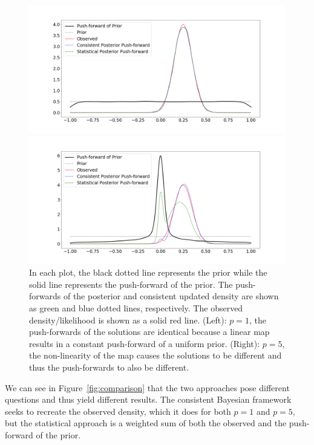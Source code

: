 \begin{ex}
\begin{figure}
\begin{minipage}{.45\textwidth}
		\includegraphics[width=\linewidth]{./images/comparison1}
\end{minipage}
\begin{minipage}{.45\textwidth}
		\includegraphics[width=\linewidth]{./images/comparison5}
\end{minipage}
\caption{In each plot, the black dotted line represents the prior while the solid line represents the push-forward of the prior. The push-forwards of the posterior and consistent updated density are shown as green and blue dotted lines, respectively. The observed density/likelihood is shown as a solid red line. (Left): $p = 1$, the push-forwards of the solutions are identical because a linear map results in a constant push-forward of a uniform prior. (Right): $p = 5$, the non-linearity of the map causes the solutions to be different and thus the push-forwards to also be different.}
\end{figure}

We can see in Figure~\ref{fig:comparison} that the two approaches pose different questions and thus yield different results. 
The consistent Bayesian framework seeks to recreate the observed density, which it does for both $p=1$ and $p=5$, but the statistical approach is a weighted sum of both the observed and the push-forward of the prior.
\end{ex}